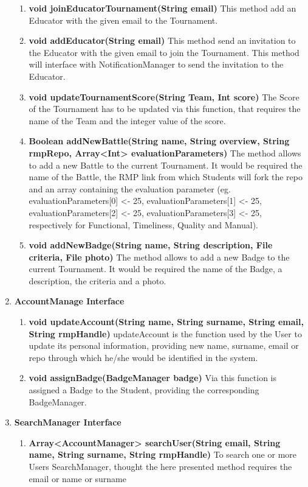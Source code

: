 \begin{enumerate}
\begin{enumerate}[label=$\bullet$]
        \item \textbf{void joinEducatorTournament(String email)} This method add an Educator with the given email to the Tournament.
        \item \textbf{void addEducator(String email)} This method send an invitation to the Educator with the given email to join the Tournament. This method will interface with NotificationManager to send the invitation to the Educator.
        \item \textbf{void updateTournamentScore(String Team, Int score)} The Score of the Tournament has to be updated via this function, that requires the name of the Team and the integer value of the score.
        \item \textbf{Boolean addNewBattle(String name, String overview, String rmpRepo, Array<Int> evaluationParameters)} The method allows to add a new Battle to the current Tournament. It would be required the name of the Battle, 
        the RMP link from which Students will fork the repo and an array containing the evaluation parameter (eg. evaluationParameters[0] <- 25, evaluationParameters[1] <- 25, evaluationParameters[2] <- 25, evaluationParameters[3] <- 25,
        respectively for Functional, Timeliness, Quality and Manual).
        \item \textbf{void addNewBadge(String name, String description, File criteria, File photo)} The method allows to add a new Badge to the current Tournament. It would be required the name of the Badge, a description, the criteria 
        and a photo.
        \end{enumerate}
    \item \textbf{AccountManage Interface} 
        \begin{enumerate}[label=$\bullet$]
            \item \textbf{void updateAccount(String name, String surname, String email, String rmpHandle)} updateAccount is the function used by the User to update its personal information, providing new name, surname, email or repo 
            through which he/she would be identified in the system.
            \item \textbf{void assignBadge(BadgeManager badge)} Via this function is assigned a Badge to the Student, providing the corresponding BadgeManager.
        \end{enumerate}
    \item \textbf{SearchManager Interface} 
        \begin{enumerate}[label=$\bullet$]
            \item \textbf{Array<AccountManager> searchUser(String email, String name, String surname, String rmpHandle)} To search one or more Users SearchManager, thought the here presented method requires the email or name or surname

\end{enumerate}
\end{enumerate}
